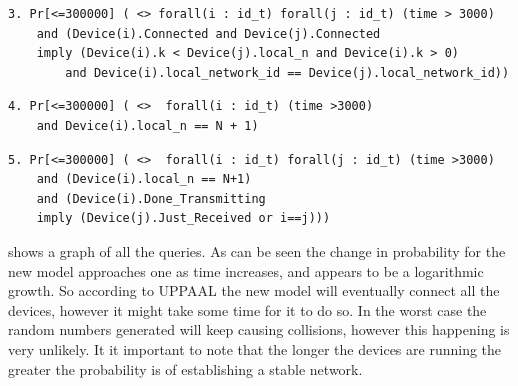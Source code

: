 \begin{lstlisting}[style=UPPAAL, title={This query asks after 3000 UPPAAL time units has passed, what then is the probability that if a device \texttt{i} and a device \texttt{j} is both connected that then \texttt{i}'s values of \texttt{k} will be larger than zero and smaller than any \texttt{n}, and that they are connected to the same network. This query ensures that all the \texttt{k}-values are within the wanted range after a network is made. UPPAAL runs this query and within 3451 runs [0.998,1] with confidence 99.9 \% this is true. This query had a run-time of 45 seconds.}]
3. Pr[<=300000] ( <> forall(i : id_t) forall(j : id_t) (time > 3000) 
    and (Device(i).Connected and Device(j).Connected 
    imply (Device(i).k < Device(j).local_n and Device(i).k > 0) 
        and Device(i).local_network_id == Device(j).local_network_id))

\end{lstlisting}

\begin{lstlisting}[style=UPPAAL, title={This query asks after 3000 UPPAAL time units has passed, what then is the probability that a device \texttt{i} has a local value of \texttt{n} to be equal to the number of devices plus the the empty slot, which is \texttt{N} + 1, which means that all devices are in the same network. UPPAAL runs this query and within 3451 runs [0.998,1] with confidence 99.9 \% this is true. This query has a run-time of 38 seconds.}]
4. Pr[<=300000] ( <>  forall(i : id_t) (time >3000) 
    and Device(i).local_n == N + 1)
\end{lstlisting}

\begin{lstlisting}[style=UPPAAL, title={This query is a generalisation of the previous which includes a check of whether when one device finish transmitting then the rest are just finished receiving. UPPAAL runs this query and within 3451 runs [0.998,1] with confidence 99.9 \% this is true. The run-time of this query is 131 seconds.}]
5. Pr[<=300000] ( <>  forall(i : id_t) forall(j : id_t) (time >3000) 
    and (Device(i).local_n == N+1) 
    and (Device(i).Done_Transmitting 
    imply (Device(j).Just_Received or i==j)))
\end{lstlisting}

\noindent
{} shows a graph of all the queries.
As can be seen the change in probability for the new model approaches one as time increases, and appears to be a logarithmic growth.
So according to UPPAAL the new model will eventually connect all the devices, however it might take some time for it to do so.
In the worst case the random numbers generated will keep causing collisions, however this happening is very unlikely. 
It it important to note that the longer the devices are running the greater the probability is of establishing a stable network.

